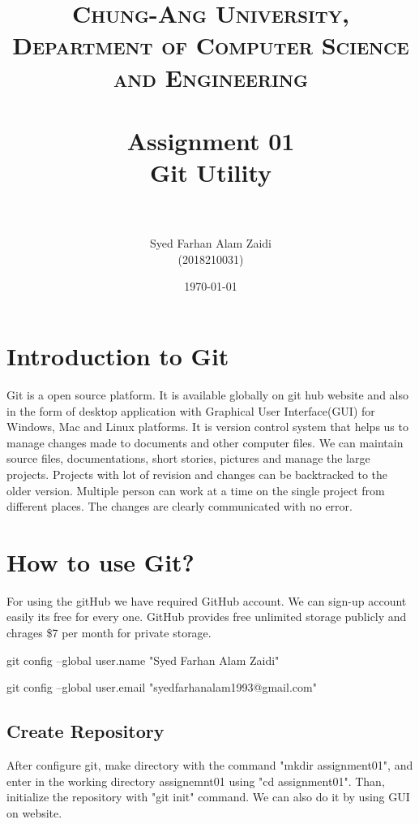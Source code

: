 \documentclass[paper=a4, fontsize=12pt]{scrartcl}
\title{	
\normalfont \normalsize 
\textsc{Chung-Ang University, Department of Computer Science and Engineering} \\ [25pt] %
\horrule{0.5pt} \\[0.4cm] %
\huge Assignment 01 \\
Git Utility\\  %
\horrule{1pt} \\[0.5cm] %
}
\author{Syed Farhan Alam Zaidi \\ (2018210031)} %
\date{\normalsize\today} %
\numberwithin{equation}{section} %
\numberwithin{figure}{section} %
\numberwithin{table}{section} %
\begin{document}
\maketitle %


\section{Introduction to Git}
\par Git is a open source platform. It is available globally on git hub website and also in the form of desktop application with Graphical User Interface(GUI) for Windows, Mac and Linux platforms.  It is version control system that helps us to manage changes made to documents and other computer files. We can maintain source files, documentations, short stories, pictures and manage the large projects. Projects with lot of revision and changes can be backtracked to the older version. Multiple person can work at a time on the single project from different places.  The changes are clearly communicated with no error.

\section{How to use Git?}
\par For using the gitHub we have required GitHub account. We can sign-up account easily its free for every one. GitHub provides free unlimited storage publicly and chrages \$7 per month for private storage.  

   \par git config --global user.name "Syed Farhan Alam Zaidi"
   \par  git config --global user.email "syedfarhanalam1993@gmail.com"

\subsection{Create Repository}
\par After configure git, make directory with the command "mkdir assignment01", and enter in the working directory assignemnt01 using "cd assignment01". Than, initialize the repository with "git init" command. We can also do it by using GUI on website.
\end{document}
